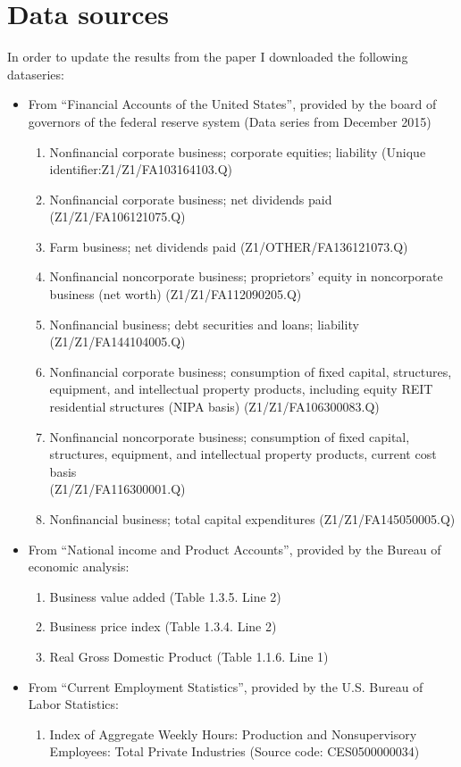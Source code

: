 \section{Data sources}
\label{sub:Data sources}

In order to update the results from the paper I downloaded the following
dataseries:
\begin{itemize}
\item From ``Financial Accounts of the United States'', provided by the board
  of governors of the federal reserve system (Data series from December 2015)
  \begin{enumerate}
  \item Nonfinancial corporate business; corporate equities; liability (Unique
    identifier:Z1/Z1/FA103164103.Q)
  \item Nonfinancial corporate business; net dividends paid
    (Z1/Z1/FA106121075.Q)
  \item Farm business; net dividends paid (Z1/OTHER/FA136121073.Q)
  \item Nonfinancial noncorporate business; proprietors' equity in noncorporate
    business (net worth) (Z1/Z1/FA112090205.Q)
  \item Nonfinancial business; debt securities and loans; liability\\
    (Z1/Z1/FA144104005.Q)
  \item Nonfinancial corporate business; consumption of fixed capital,
    structures, equipment, and intellectual property products, including equity
    REIT residential structures (NIPA basis) (Z1/Z1/FA106300083.Q)
  \item Nonfinancial noncorporate business; consumption of fixed capital,
    structures, equipment, and intellectual property products, current cost
    basis\\
    (Z1/Z1/FA116300001.Q)
  \item Nonfinancial business; total capital expenditures (Z1/Z1/FA145050005.Q)
  \end{enumerate}
\item From ``National income and Product Accounts'', provided by the Bureau of
  economic analysis:
  \begin{enumerate}
  \item Business value added (Table 1.3.5. Line 2)
  \item Business price index (Table 1.3.4. Line 2)
  \item Real Gross Domestic Product (Table 1.1.6. Line 1)
  \end{enumerate}
\item From ``Current Employment Statistics'', provided by the U.S. Bureau of
  Labor Statistics:
  \begin{enumerate}
  \item Index of Aggregate Weekly Hours: Production and Nonsupervisory
    Employees: Total Private Industries (Source code: CES0500000034)
  \end{enumerate}
\end{itemize}

